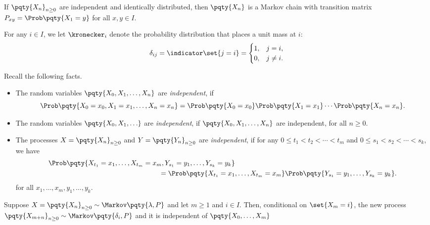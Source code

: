 \begin{example}
    If \(\pqty{X_n}_{n \geq 0}\) are independent and identically distributed, then \(\pqty{X_n}\) is a Markov chain with transition matrix \(P_{xy} = \Prob\pqty{X_1 = y}\) for all \(x, y \in I\).
\end{example}

\begin{definition}
    For any \(i \in I\), we let \(\kronecker_i\) denote the probability distribution that places a unit mass at \(i\):
    \[
        \delta_{ij} = \indicator\set{j = i} = \begin{cases}
            1, & j = i, \\
            0, & j \neq i.
        \end{cases}
    \]
\end{definition}

Recall the following facts.

\begin{itemize}
    \item The random variables \(\pqty{X_0, X_1, \ldots, X_n}\) are \emph{independent}, if
    \[
        \Prob\pqty{X_0 = x_0, X_1 = x_1, \ldots, X_n = x_n} = \Prob\pqty{X_0 = x_0} \Prob\pqty{X_1 = x_1} \cdots \Prob\pqty{X_n = x_n}.
    \]
    \item The random variables \(\pqty{X_0, X_1, \ldots}\) are \emph{independent}, if \(\pqty{X_0, X_1, \ldots, X_n}\) are independent, for all \(n \geq 0\).
    \item The processes \(X = \pqty{X_n}_{n \geq 0}\) and \(Y = \pqty{Y_n}_{n \geq 0}\) are \emph{independent}, if for any \(0 \leq t_1 < t_2 < \cdots < t_m\) and \(0 \leq s_1 < s_2 < \cdots < s_k\), we have
    \begin{align*}
        &\Prob\pqty{X_{t_1} = x_1, \ldots, X_{t_m} = x_m, Y_{s_1} = y_1, \ldots, Y_{s_k} = y_k} \\
        &\hspace{16em} = \Prob\pqty{X_{t_1} = x_1, \ldots, X_{t_m} = x_m} \Prob\pqty{Y_{s_1} = y_1, \ldots, Y_{s_k} = y_k}.
    \end{align*}
    for all \(x_1, \ldots, x_m, y_1, \ldots, y_k\).
\end{itemize}

\begin{theorem}
    \label{thm:markov-property}%
    Suppose \(X = \pqty{X_n}_{n \geq 0} \sim \Markov\pqty{\lambda, P}\) and let \(m \geq 1\) and \(i \in I\). Then, conditional on \(\set{X_m = i}\), the new process \(\pqty{X_{m + n}}_{n \geq 0} \sim \Markov\pqty{\delta_i, P}\) and it is independent of \(\pqty{X_0, \ldots, X_m}\)
\end{theorem}

